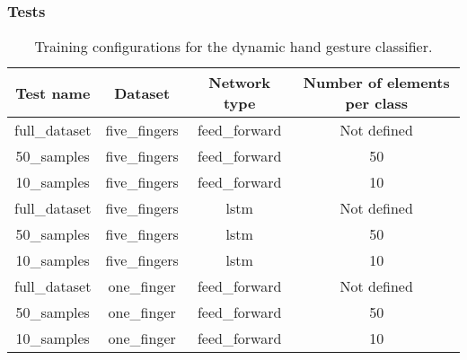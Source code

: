 \documentclass[../thesis.tex]{subfiles}
\begin{document}
\subsubsection{Tests}
\begin{table}[H]
\begin{tabular}{|c|c|c|c|}
\hline
\textbf{Test name} & \textbf{Dataset} & \textbf{Network type} & \textbf{Number of elements per class} \\ \hline
full\_dataset      & five\_fingers    & feed\_forward         & Not defined                           \\ \hline
50\_samples        & five\_fingers    & feed\_forward         & 50                                    \\ \hline
10\_samples        & five\_fingers    & feed\_forward         & 10                                    \\ \hline
full\_dataset      & five\_fingers    & lstm                  & Not defined                           \\ \hline
50\_samples        & five\_fingers    & lstm                  & 50                                    \\ \hline
10\_samples        & five\_fingers    & lstm                  & 10                                    \\ \hline
full\_dataset      & one\_finger      & feed\_forward         & Not defined                           \\ \hline
50\_samples        & one\_finger      & feed\_forward         & 50                                    \\ \hline
10\_samples        & one\_finger      & feed\_forward         & 10                                    \\ \hline
\end{tabular}
\caption{Training configurations for the dynamic hand gesture classifier.}
\label{tab:tests_dynamic_hand_gestures}
\end{table}
\end{document}
